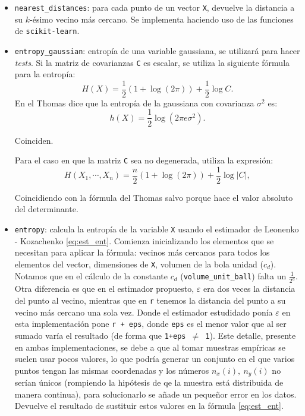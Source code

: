 \documentclass[10pt,a4paper]{article} %
\theoremstyle{definition}
\begin{document}
\begin{itemize}
\item \texttt{nearest\_distances}: para cada punto de un vector \texttt{X}, devuelve la distancia a su $k$-ésimo vecino más cercano. Se implementa haciendo uso de las funciones de \texttt{scikit-learn}.

\item \texttt{entropy\_gaussian}: entropía de una variable gaussiana, se utilizará para hacer \textit{tests}. Si la matriz de covarianzas \texttt{C} es escalar, se utiliza la siguiente fórmula para la entropía:\[
  H(X) = \frac{1}{2}\left ( 1 + \log(2\pi) \right )+ \frac{1}{2} \log C.
  \]
  En el Thomas dice que la entropía de la gaussiana con covarianza $\sigma^2$ es:\[
h(X) = \frac{1}{2}\log (2\pi e \sigma^2 ).
\]

Coinciden.

Para el caso en que la matriz \texttt{C} sea no degenerada, utiliza la expresión:\[
H(X_1,\cdots, X_n) = \frac{n}{2} \left (1 + \log(2\pi) \right) + \frac{1}{2}\log |C|,
\]

Coincidiendo con la fórmula del Thomas salvo porque hace el valor absoluto del determinante.

\item \texttt{entropy}: calcula la entropía de la variable \texttt{X} usando el estimador de Leonenko - Kozachenko \ref{eq:est_ent}. Comienza inicializando los elementos que se necesitan para aplicar la fórmula: vecinos más cercanos para todos los elementos del vector, dimensiones de \texttt{X}, volumen de la bola unidad ($c_d$). Notamos que en el cálculo de la constante $c_d$ (\texttt{volume\_unit\_ball}) falta un $\frac{1}{2^d}$. Otra diferencia es que en el estimador propuesto, $\varepsilon$ era dos veces la distancia del punto al vecino, mientras que en \texttt{r} tenemos la distancia del punto a su vecino más cercano una sola vez. Donde el estimador estudidado ponía $\varepsilon$ en esta implementación pone \texttt{r + eps}, donde \texttt{eps} es el menor valor que al ser sumado varía el resultado (de forma que  \texttt{1+eps $\neq$ 1}). Este detalle, presente en ambas implementaciones, se debe a que al tomar muestras empíricas se suelen usar pocos valores, lo que podría generar un conjunto en el que varios puntos tengan las mismas coordenadas y los números $n_x(i),\ n_y(i)$ no serían únicos (rompiendo la hipótesis de qe la muestra está distribuida de manera continua), para solucionarlo se añade un pequeñor error en los datos. Devuelve el resultado de sustituir estos valores en la fórmula \ref{eq:est_ent}.


\end{itemize}
\end{document}
